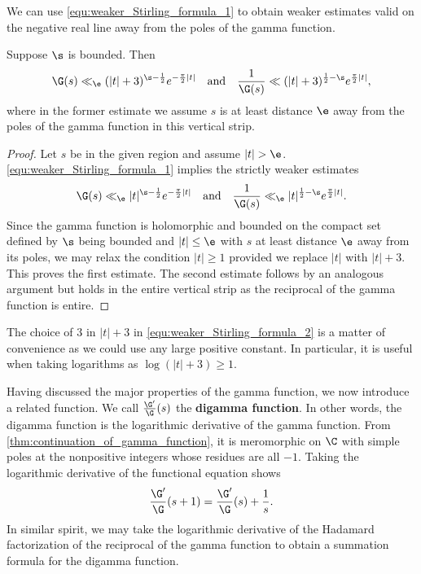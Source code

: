 \documentclass[12pt]{article}
\begin{document}
    We can use \cref{equ:weaker_Stirling_formula_1} to obtain weaker estimates valid on the negative real line away from the poles of the gamma function.

    \begin{corollary}\label{equ:weaker_Stirling_formula_2}
      Suppose \(\s\) is bounded. Then
      \[
        \G(s) \ll_{\e} (|t|+3)^{\s-\frac{1}{2}}e^{-\frac{\pi}{2}|t|} \quad \text{and} \quad \frac{1}{\G(s)} \ll (|t|+3)^{\frac{1}{2}-\s}e^{\frac{\pi}{2}|t|},
      \]
      where in the former estimate we assume \(s\) is at least distance \(\e\) away from the poles of the gamma function in this vertical strip.
    \end{corollary}
    \begin{proof}
      Let \(s\) be in the given region and assume \(|t| > \e\). \cref{equ:weaker_Stirling_formula_1} implies the strictly weaker estimates
      \[
        \G(s) \ll_{\e} |t|^{\s-\frac{1}{2}}e^{-\frac{\pi}{2}|t|} \quad \text{and} \quad \frac{1}{\G(s)} \ll_{\e} |t|^{\frac{1}{2}-\s}e^{\frac{\pi}{2}|t|}.
      \]
      Since the gamma function is holomorphic and bounded on the compact set defined by \(\s\) being bounded and \(|t| \le \e\) with \(s\) at least distance \(\e\) away from its poles, we may relax the condition \(|t| \ge 1\) provided we replace \(|t|\) with \(|t|+3\). This proves the first estimate. The second estimate follows by an analogous argument but holds in the entire vertical strip as the reciprocal of the gamma function is entire.
    \end{proof}

    The choice of \(3\) in \(|t|+3\) in \cref{equ:weaker_Stirling_formula_2} is a matter of convenience as we could use any large positive constant. In particular, it is useful when taking logarithms as \(\log(|t|+3) \ge 1\).

    Having discussed the major properties of the gamma function, we now introduce a related function. We call \(\frac{\G'}{\G}(s)\) the \textbf{digamma function}. In other words, the digamma function is the logarithmic derivative of the gamma function. From \cref{thm:continuation_of_gamma_function}, it is meromorphic on \(\C\) with simple poles at the nonpositive integers whose residues are all \(-1\). Taking the logarithmic derivative of the functional equation shows
    \[
      \frac{\G'}{\G}(s+1) = \frac{\G'}{\G}(s)+\frac{1}{s}.
    \]
    In similar spirit, we may take the logarithmic derivative of the Hadamard factorization of the reciprocal of the gamma function to obtain a summation formula for the digamma function.
\end{document}
